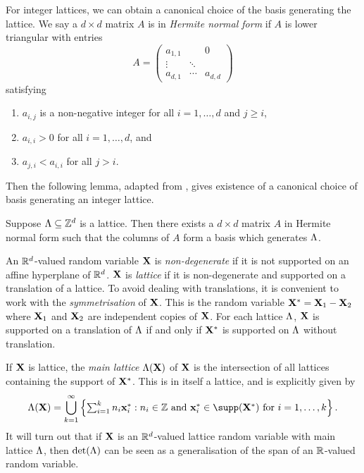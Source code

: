 For integer lattices, we can obtain a canonical choice of the basis generating the lattice. We say a $d \times d$ matrix $A$ is in \emph{Hermite normal form} if $A$ is lower triangular with entries 
\begin{equation*}
    A = \begin{pmatrix}
        a_{1, 1} &        & 0 \\
        \vdots   & \ddots &   \\
        a_{d, 1} & \cdots & a_{d, d}
    \end{pmatrix}
\end{equation*}
satisfying
\begin{enumerate}
    \item $a_{i, j}$ is a non-negative integer for all $i = 1, \ldots, d$ and $j \geq i$,
    \item $a_{i, i} > 0$ for all $i = 1, \ldots, d$, and
    \item $a_{j, i} < a_{i, i}$ for all $j > i$.
\end{enumerate}
Then the following lemma, adapted from \cite[Corollary 1]{casselsIntroductionGeometryNumbers1997}, gives existence of a canonical choice of basis generating an integer lattice.
\begin{lemma}
    \label{lem:hnf-basis}
    Suppose $\Lambda \subseteq {\mathbb Z}^d$ is a lattice. Then there exists a $d \times d$ matrix $A$ in Hermite normal form such that the columns of $A$ form a basis which generates $\Lambda$.
\end{lemma}

An ${\mathbb R}^d$-valued random variable ${\mathbf X}$ is \emph{non-degenerate} if it is not supported on an affine hyperplane of ${\mathbb R}^d$. ${\mathbf X}$ is \emph{lattice} if it is non-degenerate and supported on a translation of a lattice. To avoid dealing with translations, it is convenient to work with the \emph{symmetrisation} of ${\mathbf X}$. This is the random variable ${\mathbf X}^* = {\mathbf X}_1 - {\mathbf X}_2$ where ${\mathbf X}_1$ and ${\mathbf X}_2$ are independent copies of ${\mathbf X}$. For each lattice $\Lambda$, ${\mathbf X}$ is supported on a translation of $\Lambda$ if and only if ${\mathbf X}^*$ is supported on $\Lambda$ without translation.

If ${\mathbf X}$ is lattice, the \emph{main lattice} $\Lambda({\mathbf X})$ of ${\mathbf X}$ is the intersection of all lattices containing the support of ${\mathbf X}^*$. This is in itself a lattice, and is explicitly given by
\begin{equation*}
    \lattice(\vX) = \bigcup_{k=1}^{\infty} \left\{ 
        \textstyle \sum_{i=1}^k n_i \vx^*_i : \text{$n_i \in \Z$ and $\vx^*_i \in \supp(\vX^*)$ for $i = 1, \ldots, k$}
    \right\}.
\end{equation*}
It will turn out that if ${\mathbf X}$ is an ${\mathbb R}^d$-valued lattice random variable with main lattice $\Lambda$, then $\det(\Lambda)$ can be seen as a generalisation of the span of an ${\mathbb R}$-valued random variable.

